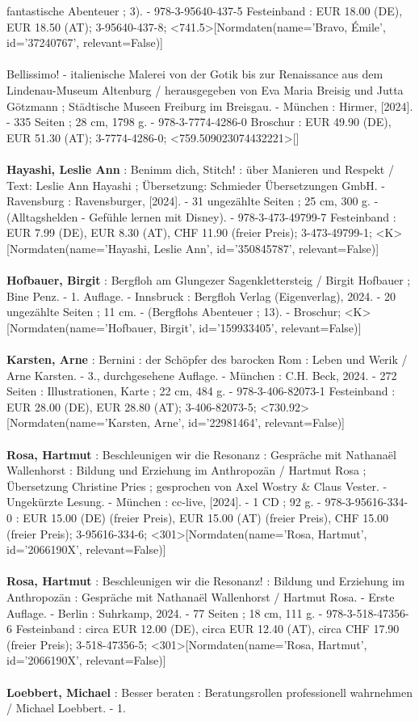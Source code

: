 \documentclass{article}
\begin{document}
\begin{multicols}{3}
fantastische Abenteuer ; 3). - 978-3-95640-437-5 Festeinband : EUR 18.00 (DE), EUR 18.50 (AT); 3-95640-437-8; <741.5>[Normdaten(name='Bravo, Émile', id='37240767', relevant=False)]\\\\Bellissimo! - italienische Malerei von der Gotik bis zur Renaissance aus dem Lindenau-Museum Altenburg / herausgegeben von Eva Maria Breisig und Jutta Götzmann ; Städtische Museen Freiburg im Breisgau. - München : Hirmer, [2024]. - 335 Seiten ; 28 cm, 1798 g. - 978-3-7774-4286-0 Broschur : EUR 49.90 (DE), EUR 51.30 (AT); 3-7774-4286-0; <759.509023074432221>[]\\\\\textbf{Hayashi, Leslie Ann} : Benimm dich, Stitch! : über Manieren und Respekt / Text: Leslie Ann Hayashi ; Übersetzung: Schmieder Übersetzungen GmbH. - Ravensburg : Ravensburger, [2024]. - 31 ungezählte Seiten ; 25 cm, 300 g. - (Alltagshelden - Gefühle lernen mit Disney). - 978-3-473-49799-7 Festeinband : EUR 7.99 (DE), EUR 8.30 (AT), CHF 11.90 (freier Preis); 3-473-49799-1; <K>[Normdaten(name='Hayashi, Leslie Ann', id='350845787', relevant=False)]\\\\\textbf{Hofbauer, Birgit} : Bergfloh am Glungezer Sagenklettersteig / Birgit Hofbauer ; Bine Penz. - 1. Auflage. - Innsbruck : Bergfloh Verlag (Eigenverlag), 2024. - 20 ungezählte Seiten ; 11 cm. - (Bergflohs Abenteuer ; 13). - Broschur; <K>[Normdaten(name='Hofbauer, Birgit', id='159933405', relevant=False)]\\\\\textbf{Karsten, Arne} : Bernini : der Schöpfer des barocken Rom : Leben und Werik / Arne Karsten. - 3., durchgesehene Auflage. - München : C.H. Beck, 2024. - 272 Seiten : Illustrationen, Karte ; 22 cm, 484 g. - 978-3-406-82073-1 Festeinband : EUR 28.00 (DE), EUR 28.80 (AT); 3-406-82073-5; <730.92>[Normdaten(name='Karsten, Arne', id='22981464', relevant=False)]\\\\\textbf{Rosa, Hartmut} : Beschleunigen wir die Resonanz : Gespräche mit Nathanaël Wallenhorst : Bildung und Erziehung im Anthropozän / Hartmut Rosa ; Übersetzung Christine Pries ; gesprochen von Axel Wostry \& Claus Vester. - Ungekürzte Lesung. - München : cc-live, [2024]. - 1 CD ; 92 g. - 978-3-95616-334-0 : EUR 15.00 (DE) (freier Preis), EUR 15.00 (AT) (freier Preis), CHF 15.00 (freier Preis); 3-95616-334-6; <301>[Normdaten(name='Rosa, Hartmut', id='2066190X', relevant=False)]\\\\\textbf{Rosa, Hartmut} : Beschleunigen wir die Resonanz! : Bildung und Erziehung im Anthropozän : Gespräche mit Nathanaël Wallenhorst / Hartmut Rosa. - Erste Auflage. - Berlin : Suhrkamp, 2024. - 77 Seiten ; 18 cm, 111 g. - 978-3-518-47356-6 Festeinband : circa EUR 12.00 (DE), circa EUR 12.40 (AT), circa CHF 17.90 (freier Preis); 3-518-47356-5; <301>[Normdaten(name='Rosa, Hartmut', id='2066190X', relevant=False)]\\\\\textbf{Loebbert, Michael} : Besser beraten : Beratungsrollen professionell wahrnehmen / Michael Loebbert. - 1. 
\end{multicols}
\end{document}
